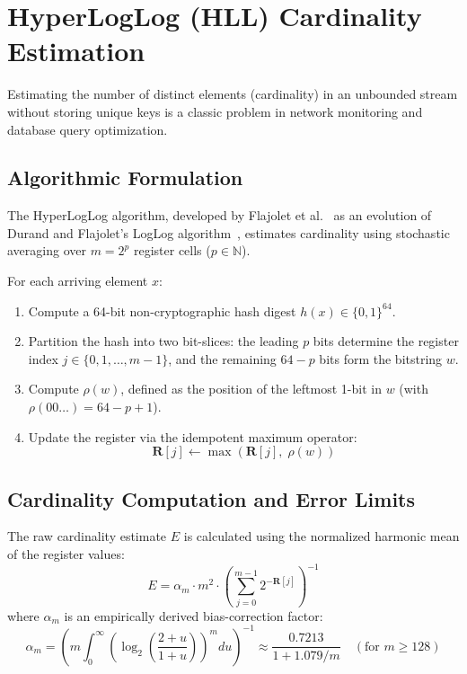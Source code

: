 \section{HyperLogLog (HLL) Cardinality Estimation}

Estimating the number of distinct elements (cardinality) in an unbounded stream without storing unique keys is a classic problem in network monitoring and database query optimization.

\subsection{Algorithmic Formulation}
The HyperLogLog algorithm, developed by Flajolet et al.~\cite{hll} as an evolution of Durand and Flajolet's LogLog algorithm~\cite{durand2003loglog}, estimates cardinality using stochastic averaging over $m = 2^p$ register cells ($p \in \mathbb{N}$).

For each arriving element $x$:
\begin{enumerate}
 \item Compute a 64-bit non-cryptographic hash digest $h(x) \in \{0, 1\}^{64}$.
 \item Partition the hash into two bit-slices: the leading $p$ bits determine the register index $j \in \{0, 1, \dots, m-1\}$, and the remaining $64 - p$ bits form the bitstring $w$.
 \item Compute $\rho(w)$, defined as the position of the leftmost 1-bit in $w$ (with $\rho(00\dots) = 64 - p + 1$).
 \item Update the register via the idempotent maximum operator:
 \begin{equation}
        \mathbf{R}[j] \leftarrow \max\left( \mathbf{R}[j],\; \rho(w) \right)
    \end{equation}
\end{enumerate}

\subsection{Cardinality Computation and Error Limits}
The raw cardinality estimate $E$ is calculated using the normalized harmonic mean of the register values:
\begin{equation}
    E = \alpha_m \cdot m^2 \cdot \left( \sum_{j=0}^{m-1} 2^{-\mathbf{R}[j]} \right)^{-1}
\end{equation}
where $\alpha_m$ is an empirically derived bias-correction factor:
\begin{equation}
    \alpha_m = \left( m \int_0^\infty \left( \log_2 \left( \frac{2 + u}{1 + u} \right) \right)^m du \right)^{-1} \approx \frac{0.7213}{1 + 1.079/m} \quad (\text{for } m \ge 128)
\end{equation}

